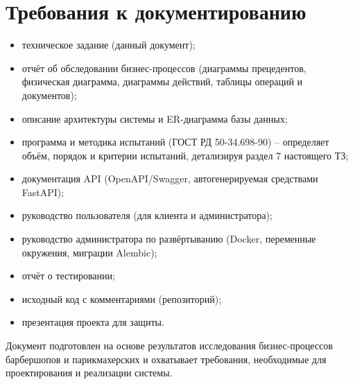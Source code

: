 \section{Требования к документированию}


\begin{itemize}
  \item техническое задание (данный документ);
  \item отчёт об обследовании бизнес-процессов (диаграммы прецедентов, физическая диаграмма, диаграммы действий, таблицы операций и документов);
  \item описание архитектуры системы и ER-диаграмма базы данных;
  \item программа и методика испытаний (ГОСТ РД 50-34.698-90) -- определяет объём, порядок и критерии испытаний, детализируя раздел 7 настоящего ТЗ;
  \item документация API (OpenAPI/Swagger, автогенерируемая средствами FastAPI);
  \item руководство пользователя (для клиента и администратора);
  \item руководство администратора по развёртыванию (Docker, переменные окружения, миграции Alembic);
  \item отчёт о тестировании;
  \item исходный код с комментариями (репозиторий);
  \item презентация проекта для защиты.
\end{itemize}

Документ подготовлен на основе результатов исследования бизнес-процессов барбершопов и парикмахерских и охватывает требования, необходимые для проектирования и реализации системы.


